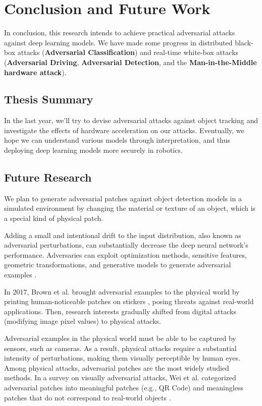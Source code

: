 \chapter{Conclusion and Future Work}

In conclusion, this research intends to achieve practical adversarial attacks against deep learning models. We have made some progress in distributed black-box attacks (\textbf{Adversarial Classification}) and real-time white-box attacks (\textbf{Adversarial Driving}, \textbf{Adversarial Detection}, and the \textbf{Man-in-the-Middle hardware attack}).

\section{Thesis Summary}

In the last year, we'll try to devise adversarial attacks against object tracking and investigate the effects of hardware acceleration on our attacks. Eventually, we hope we can understand various models through interpretation, and thus deploying deep learning models more securely in robotics.

\section{Future Research}

We plan to generate adversarial patches against object detection models in a simulated environment by changing the material or texture of an object, which is a special kind of physical patch.
   
Adding a small and intentional drift to the input distribution, also known as adversarial perturbations, can substantially decrease the deep neural network's performance. Adversaries can exploit optimization methods, sensitive features, geometric transformations, and generative models to generate adversarial examples \cite{serban2019adversarial}.

In 2017, Brown et al. brought adversarial examples to the physical world by printing human-noticeable patches on stickers \cite{brown2017adversarial}, posing threats against real-world applications. Then, research interests gradually shifted from digital attacks (modifying image pixel values) to physical attacks.

Adversarial examples in the physical world must be able to be captured by sensors, such as cameras. As a result, physical attacks require a substantial intensity of perturbations, making them visually perceptible by human eyes. Among physical attacks, adversarial patches \cite{brown2017adversarial} are the most widely studied methods. In a survey on visually adversarial attacks, Wei et al. categorized adversarial patches into meaningful patches (e.g., QR Code) and meaningless patches that do not correspond to real-world objects \cite{wei2023visually}.

